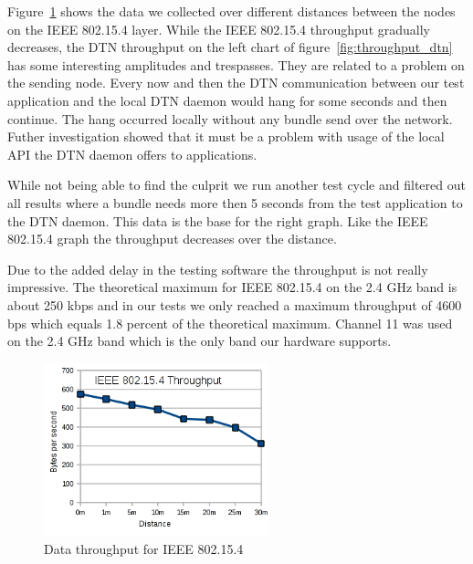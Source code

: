 Figure~\ref{fig:throughput} shows the data we collected over different distances
between the nodes on the IEEE 802.15.4 layer. While the IEEE 802.15.4 throughput
gradually decreases, the DTN throughput on the left chart of figure~\ref{fig:throughput_dtn} has some interesting amplitudes and trespasses. They
are related to a problem on the sending node. Every now and then the DTN
communication between our test application and the local DTN daemon would hang
for some seconds and then continue. The hang occurred locally without any bundle
send over the network. Futher investigation showed that it must be a problem
with usage of the local API the DTN daemon offers to applications.

While not being able to find the culprit we run another test  cycle and filtered
out all results where a bundle needs more then 5 seconds from the test
application to the DTN daemon. This data is the base for the right graph. Like
the IEEE 802.15.4 graph the throughput decreases over the distance.

Due to the added delay in the testing software the throughput is
not really impressive. The theoretical maximum for IEEE 802.15.4 on the 2.4 GHz
band is about 250 kbps and in our tests we only reached a maximum throughput of
4600 bps which equals 1.8 percent of the theoretical maximum. Channel 11 was used
on the 2.4 GHz band which is the only band our hardware supports.

\begin{figure}
  \begin{center}
    \includegraphics[width=6.5cm]{images/throughput_802154}
    \caption{Data throughput for IEEE 802.15.4}
    \label{fig:throughput}
  \end{center}
\end{figure}

